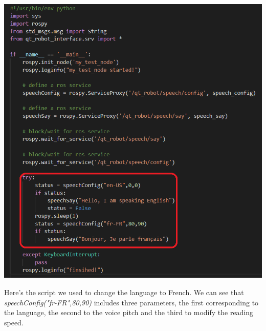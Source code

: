 \begin{minipage}{.6\textwidth}%
\includegraphics[width=\textwidth]{Figures/qtrobotscript2langue.png}
\end{minipage}%
\hfill
\begin{minipage}{.33\textwidth}%
Here's the script we used to change the language to French. We can see that \textit{speechConfig("fr-FR",80,90)} includes three parameters, the first corresponding to the language, the second to the voice pitch and the third to modify the reading speed.\\
\end{minipage}%

